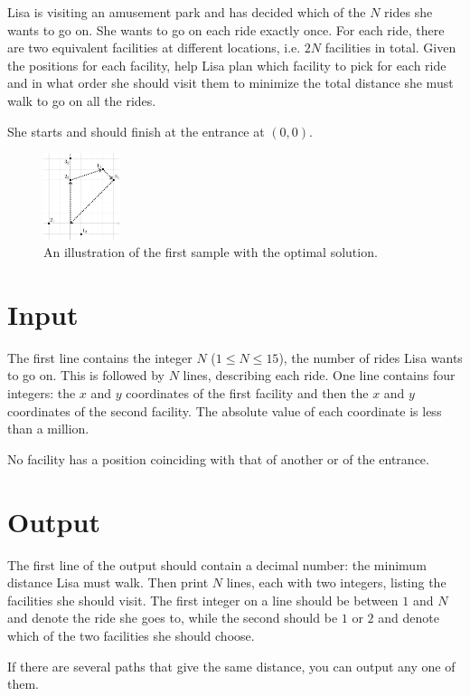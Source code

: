 
Lisa is visiting an amusement park and has decided which of the $N$ rides she wants to go on.
She wants to go on each ride exactly once.
For each ride, there are two equivalent facilities at different locations, i.e. $2N$ facilities in total.
Given the positions for each facility, help Lisa plan which facility to pick for each ride and in what order she should visit them to minimize the total distance she must walk to go on all the rides.

She starts and should finish at the entrance at $(0, 0)$.

\begin{figure}[h]
    \centering
    \includegraphics[width=0.2\textwidth]{tivoli}
    \caption{An illustration of the first sample with the optimal solution.}
\end{figure}

\section*{Input}
The first line contains the integer $N$ ($1 \le N \le 15$), the number of rides Lisa wants to go on.
This is followed by $N$ lines, describing each ride.
One line contains four integers: the $x$ and $y$ coordinates of the first facility and then the $x$ and $y$ coordinates of the second facility.
The absolute value of each coordinate is less than a million.

No facility has a position coinciding with that of another or of the entrance.

\section*{Output}
The first line of the output should contain a decimal number: the minimum distance Lisa must walk.
Then print $N$ lines, each with two integers, listing the facilities she should visit.
The first integer on a line should be between $1$ and $N$ and denote the ride she goes to, while the second should be $1$ or $2$ and denote which of the two facilities she should choose.

If there are several paths that give the same distance, you can output any one of them.

